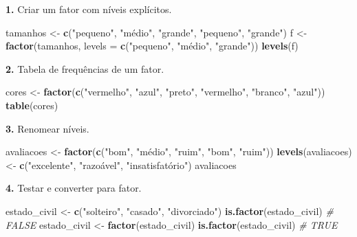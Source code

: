 \documentclass[
  portuguese,
  11pt,
  openany]{book}
\newenvironment{Shaded}{\begin{snugshade}}{\end{snugshade}}
\newcommand{\AttributeTok}[1]{\textcolor[rgb]{0.13,0.29,0.53}{#1}}
\newcommand{\CommentTok}[1]{\textcolor[rgb]{0.56,0.35,0.01}{\textit{#1}}}
\newcommand{\FunctionTok}[1]{\textcolor[rgb]{0.13,0.29,0.53}{\textbf{#1}}}
\newcommand{\NormalTok}[1]{#1}
\newcommand{\OtherTok}[1]{\textcolor[rgb]{0.56,0.35,0.01}{#1}}
\newcommand{\StringTok}[1]{\textcolor[rgb]{0.31,0.60,0.02}{#1}}
\begin{document}
\textbf{1.} Criar um fator com níveis explícitos.

\begin{Shaded}
\begin{Highlighting}[]
\NormalTok{tamanhos }\OtherTok{\textless{}{-}} \FunctionTok{c}\NormalTok{(}\StringTok{"pequeno"}\NormalTok{, }\StringTok{"médio"}\NormalTok{, }\StringTok{"grande"}\NormalTok{, }\StringTok{"pequeno"}\NormalTok{, }\StringTok{"grande"}\NormalTok{)}
\NormalTok{f }\OtherTok{\textless{}{-}} \FunctionTok{factor}\NormalTok{(tamanhos, }\AttributeTok{levels =} \FunctionTok{c}\NormalTok{(}\StringTok{"pequeno"}\NormalTok{, }\StringTok{"médio"}\NormalTok{, }\StringTok{"grande"}\NormalTok{))}
\FunctionTok{levels}\NormalTok{(f)}
\end{Highlighting}
\end{Shaded}

\textbf{2.} Tabela de frequências de um fator.

\begin{Shaded}
\begin{Highlighting}[]
\NormalTok{cores }\OtherTok{\textless{}{-}} \FunctionTok{factor}\NormalTok{(}\FunctionTok{c}\NormalTok{(}\StringTok{"vermelho"}\NormalTok{, }\StringTok{"azul"}\NormalTok{, }\StringTok{"preto"}\NormalTok{, }\StringTok{"vermelho"}\NormalTok{, }\StringTok{"branco"}\NormalTok{, }\StringTok{"azul"}\NormalTok{))}
\FunctionTok{table}\NormalTok{(cores)}
\end{Highlighting}
\end{Shaded}

\textbf{3.} Renomear níveis.

\begin{Shaded}
\begin{Highlighting}[]
\NormalTok{avaliacoes }\OtherTok{\textless{}{-}} \FunctionTok{factor}\NormalTok{(}\FunctionTok{c}\NormalTok{(}\StringTok{"bom"}\NormalTok{, }\StringTok{"médio"}\NormalTok{, }\StringTok{"ruim"}\NormalTok{, }\StringTok{"bom"}\NormalTok{, }\StringTok{"ruim"}\NormalTok{))}
\FunctionTok{levels}\NormalTok{(avaliacoes) }\OtherTok{\textless{}{-}} \FunctionTok{c}\NormalTok{(}\StringTok{"excelente"}\NormalTok{, }\StringTok{"razoável"}\NormalTok{, }\StringTok{"insatisfatório"}\NormalTok{)}
\NormalTok{avaliacoes}
\end{Highlighting}
\end{Shaded}

\textbf{4.} Testar e converter para fator.

\begin{Shaded}
\begin{Highlighting}[]
\NormalTok{estado\_civil }\OtherTok{\textless{}{-}} \FunctionTok{c}\NormalTok{(}\StringTok{"solteiro"}\NormalTok{, }\StringTok{"casado"}\NormalTok{, }\StringTok{"divorciado"}\NormalTok{)}
\FunctionTok{is.factor}\NormalTok{(estado\_civil)              }\CommentTok{\# FALSE}
\NormalTok{estado\_civil }\OtherTok{\textless{}{-}} \FunctionTok{factor}\NormalTok{(estado\_civil)}
\FunctionTok{is.factor}\NormalTok{(estado\_civil)              }\CommentTok{\# TRUE}
\end{Highlighting}
\end{Shaded}
\end{document}
